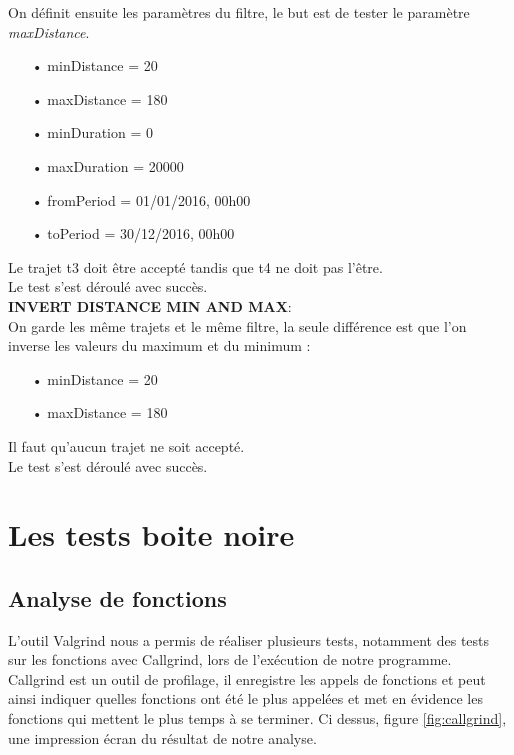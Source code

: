 \documentclass[12pt]{article}
\begin{document}
	On définit ensuite les paramètres du filtre, le but est de tester le paramètre \textit{maxDistance}.
	\begin{itemize}
	\item[•] minDistance = 20
	\item[•] maxDistance = 180
	\item[•] minDuration = 0
	\item[•] maxDuration = 20000
	\item[•] fromPeriod = 01/01/2016, 00h00
	\item[•] toPeriod = 30/12/2016, 00h00
	\end{itemize}

	Le trajet t3 doit être accepté tandis que t4 ne doit pas l’être.\\

	Le test s’est déroulé avec succès.\\


	\textbf{INVERT DISTANCE MIN AND MAX}:\\
	On garde les même trajets et le même filtre, la seule différence est que l’on inverse les valeurs du maximum et du minimum :\\
	\begin{itemize}
	\item[•] minDistance = 20	
	\item[•] maxDistance = 180
	\end{itemize}

	Il faut qu’aucun trajet ne soit accepté. \\

	Le test s’est déroulé avec succès. \\
	
	\newpage
	\section{Les tests boite noire}	
		\subsection{Analyse de fonctions}
		L’outil Valgrind nous a permis de réaliser plusieurs tests, notamment des tests sur les
		fonctions avec Callgrind, lors de l'exécution de notre programme.\\
		Callgrind est un outil de profilage, il enregistre les appels de fonctions et peut
		ainsi indiquer quelles fonctions ont été le plus appelées et met en évidence les fonctions
		qui mettent le plus temps à se terminer.
		Ci dessus, figure \ref{fig:callgrind}, une impression écran du résultat de notre analyse.\\
	
\end{document}
